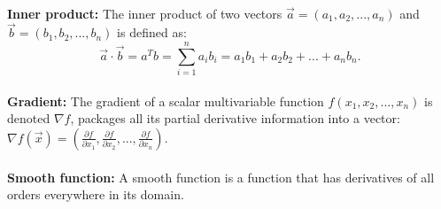 \documentclass[12pt]{article}
\begin{document}
\\\textbf{Inner product:} The inner product of two vectors $\vec{a} = (a_1, a_2,..., a_n)$ and $\vec{b} = (b_1, b_2,..., b_n)$ is defined as:
$$\vec{a} \cdot \vec{b} = a^T b =\sum_{i=1}^{n}a_i b_i = a_1b_1+a_2b_2+...+a_n b_n.$$
\\\textbf{Gradient:} The gradient of a scalar multivariable function $f(x_1, x_2,...,x_n)$ is denoted $\nabla f$, packages all its partial derivative information into a vector: $\nabla f(\vec{x}) = (\frac{\partial{f}}{\partial{x_1}},\frac{\partial{f}}{\partial{x_2}},...,\frac{\partial{f}}{\partial{x_n}})$.\\
\\\textbf{Smooth function:} A smooth function is a function that has derivatives of all orders everywhere in its domain.
 
\newpage
\end{document}
